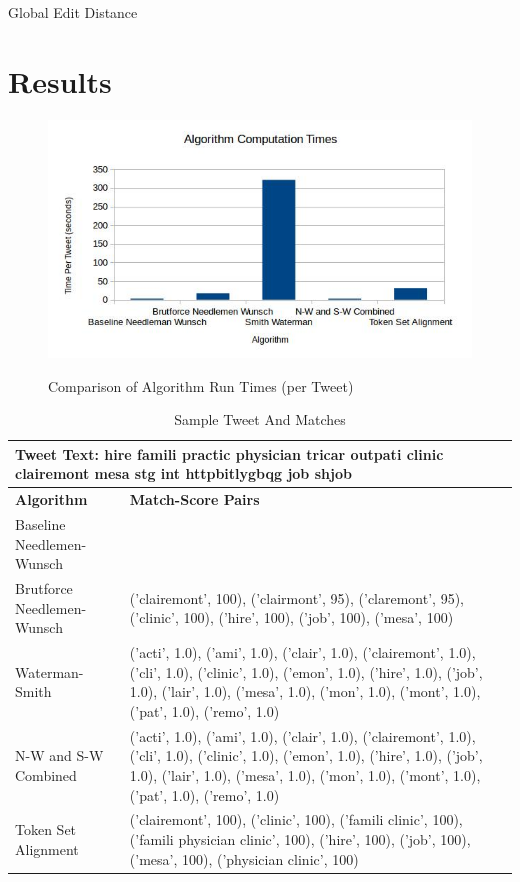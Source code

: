 \documentclass[11pt,a4paper]{article}
\begin{document}
Global Edit Distance 

\section{Results}

\begin{figure}[ht]
	\centering
	\caption{Comparison of Algorithm Run Times (per Tweet)}
	\includegraphics[scale=0.8]{times1.jpg}
	\label{figure:times-graph}
\end{figure}

\begin{table} [ht]
\caption{Sample Tweet And Matches}
\begin{center}
	\begin{tabular}{| p{5.5cm} | p{10cm} |}
	\hline
	\multicolumn{2}{|p{15.5cm}|}{\textbf{Tweet Text:} hire famili practic physician tricar outpati clinic clairemont mesa stg int httpbitlygbqg job shjob} \\
	\hline
	\textbf{Algorithm} & \textbf{Match-Score Pairs}\\
	\hline
	Baseline Needlemen-Wunsch & \\
	\hline
	Brutforce Needlemen-Wunsch & ('clairemont', 100), ('clairmont', 95), ('claremont', 95), ('clinic', 100), ('hire', 100), ('job', 100), ('mesa', 100)\\
	\hline
	Waterman-Smith & ('acti', 1.0), ('ami', 1.0), ('clair', 1.0), ('clairemont', 1.0), ('cli', 1.0), ('clinic', 1.0), ('emon', 1.0), ('hire', 1.0), ('job', 1.0), ('lair', 1.0), ('mesa', 1.0), ('mon', 1.0), ('mont', 1.0), ('pat', 1.0), ('remo', 1.0)\\
	\hline
	N-W and S-W Combined & ('acti', 1.0), ('ami', 1.0), ('clair', 1.0), ('clairemont', 1.0), ('cli', 1.0), ('clinic', 1.0), ('emon', 1.0), ('hire', 1.0), ('job', 1.0), ('lair', 1.0), ('mesa', 1.0), ('mon', 1.0), ('mont', 1.0), ('pat', 1.0), ('remo', 1.0)\\
	\hline
	Token Set Alignment & ('clairemont', 100), ('clinic', 100), ('famili clinic', 100), ('famili physician clinic', 100), ('hire', 100), ('job', 100), ('mesa', 100), ('physician clinic', 100)\\
	\hline
	\end{tabular}
\end{center}
\label{table:alg-table}
\end{table}
\end{document}
